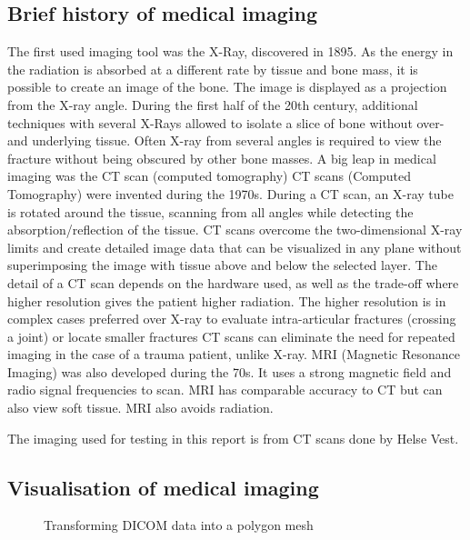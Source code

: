 \documentclass[a4paper]{report}
\begin{document}
\subsection{Brief history of medical imaging}
The first used imaging tool was the X-Ray, discovered in 1895\cite{hamblen_outline_2010}\cite{suetens_fundamentals_2017}. As the energy in the radiation is absorbed at a different rate by tissue and bone mass, it is possible to create an image of the bone. The image is displayed as a projection from the X-ray angle. During the first half of the 20th century, additional techniques with several X-Rays allowed to isolate a slice of bone without over- and underlying tissue. Often X-ray from several angles is required to view the fracture without being obscured by other bone masses\cite{ebnezar_textbook_2016}.
A big leap in medical imaging was the CT scan (computed tomography)\cite{bradley_history_2008}
CT scans (Computed Tomography) were invented during the 1970s. During a CT scan, an X-ray tube is rotated around the tissue, scanning from all angles while detecting the absorption/reflection of the tissue. CT scans overcome the two-dimensional X-ray limits and create detailed image data that can be visualized in any plane without superimposing the image with tissue above and below the selected layer\cite{hamblen_outline_2010}. The detail of a CT scan depends on the hardware used, as well as the trade-off where higher resolution gives the patient higher radiation\cite{bradley_history_2008}. The higher resolution is in complex cases preferred over X-ray to evaluate intra-articular fractures (crossing a joint) or locate smaller fractures\cite{ebnezar_textbook_2016}
CT scans can eliminate the need for repeated imaging in the case of a trauma patient, unlike X-ray\cite{swiontkowski_manual_2013}.
MRI (Magnetic Resonance Imaging) was also developed during the 70s. It uses a strong magnetic field and radio signal frequencies to scan. MRI has comparable accuracy to CT but can also view soft tissue. MRI also avoids radiation\cite{swiontkowski_manual_2013}.


The imaging used for testing in this report is from CT scans done by Helse Vest.

\subsection{Visualisation of medical imaging}

\begin{figure}[h!]
    \centering
	\hfill
  \caption{Transforming DICOM data into a polygon mesh}
\end{figure}
\end{document}
